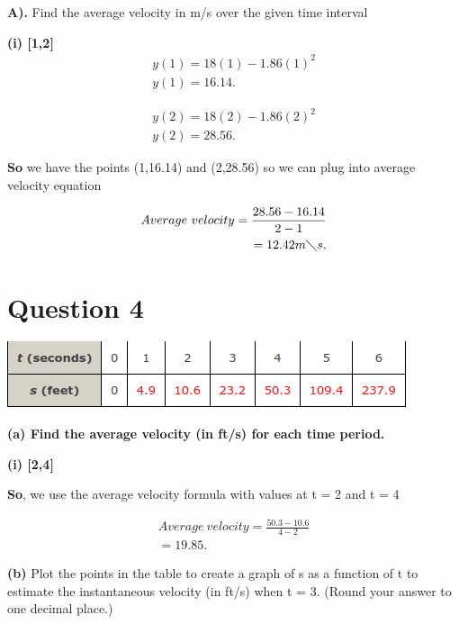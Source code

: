 \documentclass{report}
\begin{document}
    \bigbreak \noindent 
    \textbf{A).} Find the average velocity in m/s over the given time interval  
   
    \bigbreak \noindent 
    \textbf{(i) [1,2]} 
    \begin{align*}
        y \left(1\right) = 18 \left(1\right) - 1.86 \left(1\right) ^2 \\
        y \left(1\right) = 16.14
    .\end{align*}

    \bigbreak \noindent  
    \begin{align*}
        y \left(2\right) = 18 \left(2\right) - 1.86 \left(2\right) ^2 \\ 
        y \left(2\right) = 28.56 
    .\end{align*}

    \bigbreak \noindent 
    \textbf{So} we have the points (1,16.14) and (2,28.56) so we can plug into average 
    velocity equation

    \bigbreak \noindent 
    \begin{align*}
        Average\ velocity = \frac{28.56 - 16.14}{2-1} \\
        = 12.42 m \diagdown s
    .\end{align*}

    \pagebreak
    \section{\Large{Question 4}}

    \bigbreak \noindent \bigbreak \noindent 
    
    \bigbreak \noindent 
    \begin{center}
        \includegraphics[scale=0.7]{hw4.png}
    \end{center}
    
    \bigbreak \noindent 
    \textbf{(a) Find the average velocity (in ft/s) for each time period.}
    
    \bigbreak \noindent 
    \textbf{(i) [2,4]}
    
    \bigbreak \noindent 
    \textbf{So}, we use the average velocity formula with values at t = 2 and t = 4
    
    \begin{align*}
        Average\ velocity = \frac{50.3-10.6}{4-2} \\
        = 19.85 
    .\end{align*}

    \bigbreak \noindent 
    \textbf{(b)} Plot the points in the table to create a graph of s as a function of t to estimate the instantaneous velocity (in ft/s) when t = 3. (Round your answer to one decimal place.)
    
    \bigbreak \noindent 
    
\end{document}
